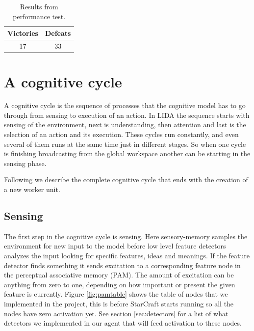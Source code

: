 \begin{table}
\begin{center}
\begin{tabular}{| c | c |}
  \hline                        
  Victories & Defeats\\
  \hline
  17 & 33 \\
  \hline  
\end{tabular}
\caption{Results from performance test.}
\label{tab:test_results}
\end{center}
\end{table}

\section{A cognitive cycle}
A cognitive cycle is the sequence of processes that the cognitive model has to go through from sensing to execution of an action. In LIDA the sequence starts with sensing of the environment, next is understanding, then attention and last is the selection of an action and its execution. These cycles run constantly, and even several of them runs at the same time just in different stages. So when one cycle is finishing broadcasting from the global workspace another can be starting in the sensing phase. 

Following we describe the complete cognitive cycle that ends with the creation of a new worker unit. 	

\subsection{Sensing}
The first step in the cognitive cycle is sensing. Here sensory-memory samples the environment for new input to the model before low level feature detectors analyzes the input looking for specific features, ideas and meanings. If the feature detector finds something it sends excitation to a corresponding feature node in the perceptual associative memory (PAM). The amount of excitation can be anything from zero to one, depending on how important or present the given feature is currently. Figure \ref{fig:pamtable} shows the table of nodes that we implemented in the project, this is before StarCraft starts running so all the nodes have zero activation yet. See section \ref{sec:detectors} for a list of what detectors we implemented in our agent that will feed activation to these nodes. 

